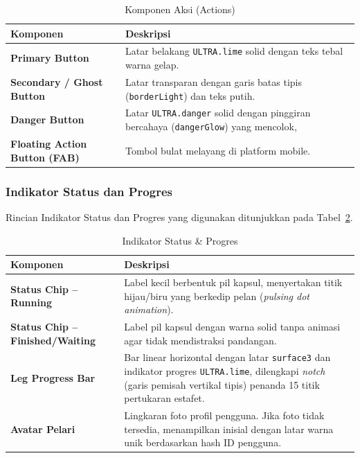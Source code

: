\begin{table}[htbp]
    \centering
    \small
    \caption{Komponen Aksi (Actions)}
    \label{tab:komponen-aksi}
    \begin{tabular}{|>{\bfseries}p{3.4cm}|p{9.4cm}|}
        \hline
        \textbf{Komponen} & \textbf{Deskripsi} \\
        \hline
        Primary Button & Latar belakang \texttt{ULTRA.lime} solid dengan teks tebal warna gelap. \\
        \hline
        Secondary / Ghost Button & Latar transparan dengan garis batas tipis (\texttt{borderLight}) dan teks putih. \\
        \hline
        Danger Button & Latar \texttt{ULTRA.danger} solid dengan pinggiran bercahaya (\texttt{dangerGlow}) yang mencolok, \\
        \hline
        Floating Action Button (FAB) & Tombol bulat melayang di platform mobile. \\
        \hline
    \end{tabular}
\end{table}
 
\subsubsection{Indikator Status dan Progres}
\label{subsubsec:indikator-status}
Rincian Indikator Status dan Progres yang digunakan ditunjukkan pada Tabel~\ref{tab:indikator-status}.
\begin{table}[htbp]
    \centering
    \small
    \caption{Indikator Status \& Progres}
    \label{tab:indikator-status}
    \begin{tabular}{|>{\bfseries}p{3.4cm}|p{9.4cm}|}
        \hline
        \textbf{Komponen} & \textbf{Deskripsi} \\
        \hline
        Status Chip -- Running & Label kecil berbentuk pil kapsul, menyertakan titik hijau/biru yang berkedip pelan (\textit{pulsing dot animation}). \\
        \hline
        Status Chip -- Finished/Waiting & Label pil kapsul dengan warna solid tanpa animasi agar tidak mendistraksi pandangan. \\
        \hline
        Leg Progress Bar & Bar linear horizontal dengan latar \texttt{surface3} dan indikator progres \texttt{ULTRA.lime}, dilengkapi \textit{notch} (garis pemisah vertikal tipis) penanda 15 titik pertukaran estafet. \\
        \hline
        Avatar Pelari & Lingkaran foto profil pengguna. Jika foto tidak tersedia, menampilkan inisial dengan latar warna unik berdasarkan hash ID pengguna. \\
        \hline
    \end{tabular}
\end{table}
 

